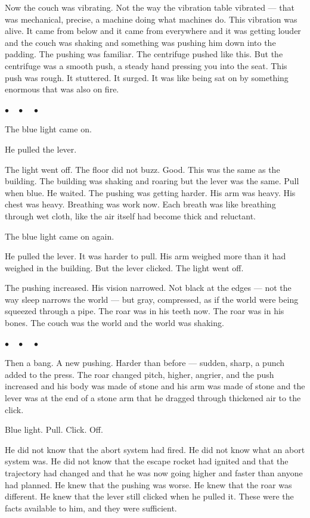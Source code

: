 \documentclass[12pt, letterpaper]{article}
\begin{document}
Now the couch was vibrating. Not the way the vibration table vibrated --- that was mechanical, precise, a machine doing what machines do. This vibration was alive. It came from below and it came from everywhere and it was getting louder and the couch was shaking and something was pushing him down into the padding. The pushing was familiar. The centrifuge pushed like this. But the centrifuge was a smooth push, a steady hand pressing you into the seat. This push was rough. It stuttered. It surged. It was like being sat on by something enormous that was also on fire.

\begin{center}
$\bullet\quad\bullet\quad\bullet$
\end{center}

The blue light came on.

He pulled the lever.

The light went off. The floor did not buzz. Good. This was the same as the building. The building was shaking and roaring but the lever was the same. Pull when blue. He waited. The pushing was getting harder. His arm was heavy. His chest was heavy. Breathing was work now. Each breath was like breathing through wet cloth, like the air itself had become thick and reluctant.

The blue light came on again.

He pulled the lever. It was harder to pull. His arm weighed more than it had weighed in the building. But the lever clicked. The light went off.

The pushing increased. His vision narrowed. Not black at the edges --- not the way sleep narrows the world --- but gray, compressed, as if the world were being squeezed through a pipe. The roar was in his teeth now. The roar was in his bones. The couch was the world and the world was shaking.

\begin{center}
$\bullet\quad\bullet\quad\bullet$
\end{center}

Then a bang. A new pushing. Harder than before --- sudden, sharp, a punch added to the press. The roar changed pitch, higher, angrier, and the push increased and his body was made of stone and his arm was made of stone and the lever was at the end of a stone arm that he dragged through thickened air to the click.

Blue light. Pull. Click. Off.

He did not know that the abort system had fired. He did not know what an abort system was. He did not know that the escape rocket had ignited and that the trajectory had changed and that he was now going higher and faster than anyone had planned. He knew that the pushing was worse. He knew that the roar was different. He knew that the lever still clicked when he pulled it. These were the facts available to him, and they were sufficient.
\end{document}
